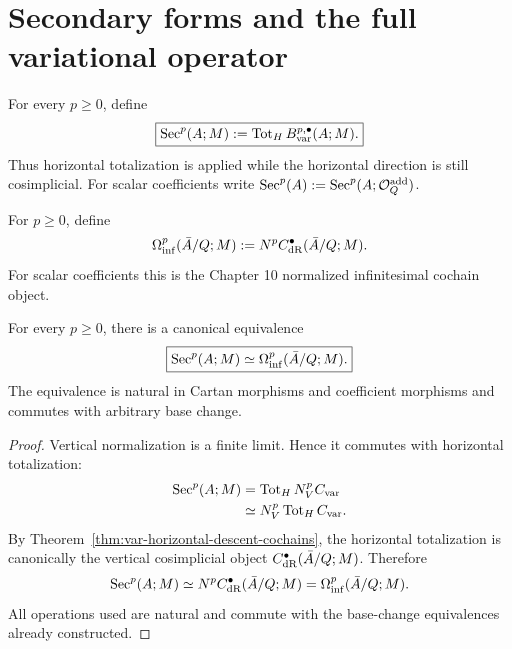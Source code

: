 \section{Secondary forms and the full variational operator}
\label{sec:var-secondary-forms}

\begin{definition}
\label{def:var-secondary}
For every \(p\ge0\), define
\[
    \boxed{
    \operatorname{Sec}^p(A;M)
    :=
    \operatorname{Tot}_HB_{\mathrm{var}}^{p,\bullet}(A;M).
    }
\]
Thus horizontal totalization is applied while the horizontal direction is still cosimplicial. For scalar coefficients write \(\operatorname{Sec}^p(A):=\operatorname{Sec}^p(A;\mathcal O^{\mathrm{add}}_Q)\).
\end{definition}

\begin{definition}
\label{def:var-coefficient-normalized}
For \(p\ge0\), define
\[
    \Omega_{\mathrm{inf}}^p(\bar A/Q;M)
    :=
    N^pC_{\mathrm{dR}}^{\bullet}(\bar A/Q;M).
\]
For scalar coefficients this is the Chapter 10 normalized infinitesimal cochain object.
\end{definition}

\begin{theorem}
\label{thm:var-secondary-identification}
For every \(p\ge0\), there is a canonical equivalence
\[
    \boxed{
    \operatorname{Sec}^p(A;M)
    \simeq
    \Omega_{\mathrm{inf}}^p(\bar A/Q;M).
    }
\]
The equivalence is natural in Cartan morphisms and coefficient morphisms and commutes with arbitrary base change.
\end{theorem}

\begin{proof}
Vertical normalization is a finite limit. Hence it commutes with horizontal totalization:
\[
\begin{aligned}
    \operatorname{Sec}^p(A;M)
    &=
    \operatorname{Tot}_HN_V^pC_{\mathrm{var}}\\
    &\simeq
    N_V^p\operatorname{Tot}_HC_{\mathrm{var}}.
\end{aligned}
\]
By Theorem~\ref{thm:var-horizontal-descent-cochains}, the horizontal totalization is canonically the vertical cosimplicial object \(C_{\mathrm{dR}}^{\bullet}(\bar A/Q;M)\). Therefore
\[
    \operatorname{Sec}^p(A;M)
    \simeq
    N^pC_{\mathrm{dR}}^{\bullet}(\bar A/Q;M)
    =
    \Omega_{\mathrm{inf}}^p(\bar A/Q;M).
\]
All operations used are natural and commute with the base-change equivalences already constructed.
\end{proof}

